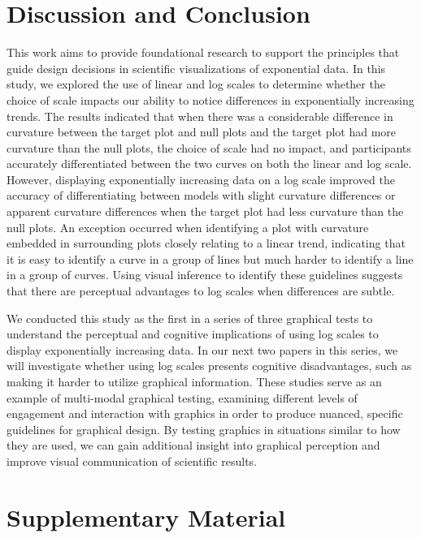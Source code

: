 \documentclass[12pt]{article}
\begin{document}
\hypertarget{discussion-conclusion}{%
\section{Discussion and Conclusion}\label{discussion-conclusion}}

This work aims to provide foundational research to support the
principles that guide design decisions in scientific visualizations of
exponential data. In this study, we explored the use of linear and log
scales to determine whether the choice of scale impacts our ability to
notice differences in exponentially increasing trends. The results
indicated that when there was a considerable difference in curvature
between the target plot and null plots and the target plot had more
curvature than the null plots, the choice of scale had no impact, and
participants accurately differentiated between the two curves on both
the linear and log scale. However, displaying exponentially increasing
data on a log scale improved the accuracy of differentiating between
models with slight curvature differences or apparent curvature
differences when the target plot had less curvature than the null plots.
An exception occurred when identifying a plot with curvature embedded in
surrounding plots closely relating to a linear trend, indicating that it
is easy to identify a curve in a group of lines but much harder to
identify a line in a group of curves. Using visual inference to identify
these guidelines suggests that there are perceptual advantages to log
scales when differences are subtle.

We conducted this study as the first in a series of three graphical
tests to understand the perceptual and cognitive implications of using
log scales to display exponentially increasing data. In our next two
papers in this series, we will investigate whether using log scales
presents cognitive disadvantages, such as making it harder to utilize
graphical information.
{\textcolor{RedOrange}{These studies serve as an example of multi-modal graphical testing, examining different levels of engagement and interaction with graphics in order to produce nuanced, specific guidelines for graphical design.
By testing graphics in situations similar to how they are used, we can gain additional insight into graphical perception and improve visual communication of scientific results.}}

\hypertarget{supplementary-material}{%
\section*{Supplementary Material}\label{supplementary-material}}
\end{document}
